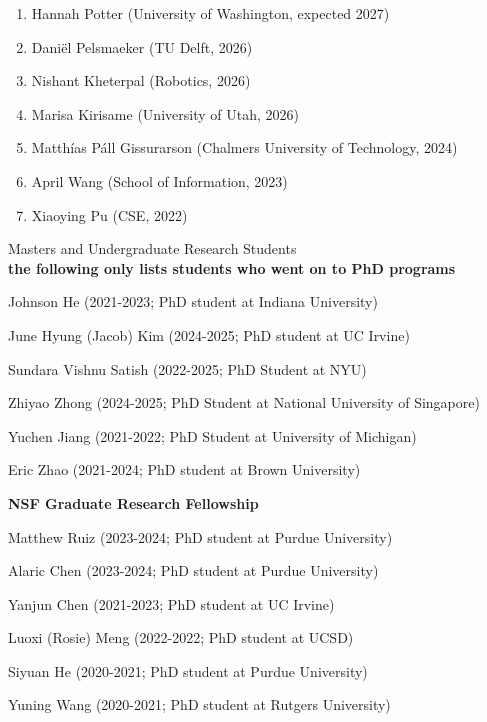 \documentclass[10pt,letterpaper]{article}
\renewenvironment{itemize}{
  \begin{list}{}{
    \setlength{\leftmargin}{1.25em}
    \setlength{\itemsep}{0.25em}
    \setlength{\parskip}{0pt}
    \setlength{\parsep}{0.2em}
  }
}{
  \end{list}
}
\begin{document}
\begin{itemize}
\begin{enumerate}
          \item Hannah Potter (University of Washington, expected 2027)
          \item Daniël Pelsmaeker (TU Delft, 2026)
          \item Nishant Kheterpal (Robotics, 2026)
          \item Marisa Kirisame (University of Utah, 2026)
          \item Matthías Páll Gissurarson (Chalmers University of Technology, 2024)
          \item April Wang (School of Information, 2023)
          \item Xiaoying Pu (CSE, 2022)
        \end{enumerate}
  \item Masters and Undergraduate Research Students
  \\ \textbf{the following only lists students who went on to PhD programs}
        \begin{enumerate}
          \item Johnson He (2021-2023; PhD student at Indiana University)
          \item June Hyung (Jacob) Kim (2024-2025; PhD student at UC Irvine)
          \item Sundara Vishnu Satish (2022-2025; PhD Student at NYU)
          \item Zhiyao Zhong (2024-2025; PhD Student at National University of Singapore)
          \item Yuchen Jiang (2021-2022; PhD Student at University of Michigan)
          \item Eric Zhao (2021-2024; PhD student at Brown University)
            \begin{itemize}
              \item \textbf{NSF Graduate Research Fellowship}
            \end{itemize}
          \item Matthew Ruiz (2023-2024; PhD student at Purdue University)
          \item Alaric Chen (2023-2024; PhD student at Purdue University)
          \item Yanjun Chen (2021-2023; PhD student at UC Irvine)
          \item Luoxi (Rosie) Meng (2022-2022; PhD student at UCSD)
          \item Siyuan He (2020-2021; PhD student at Purdue University)
          \item Yuning Wang (2020-2021; PhD student at Rutgers University)

\end{enumerate}
\end{itemize}
\end{document}
